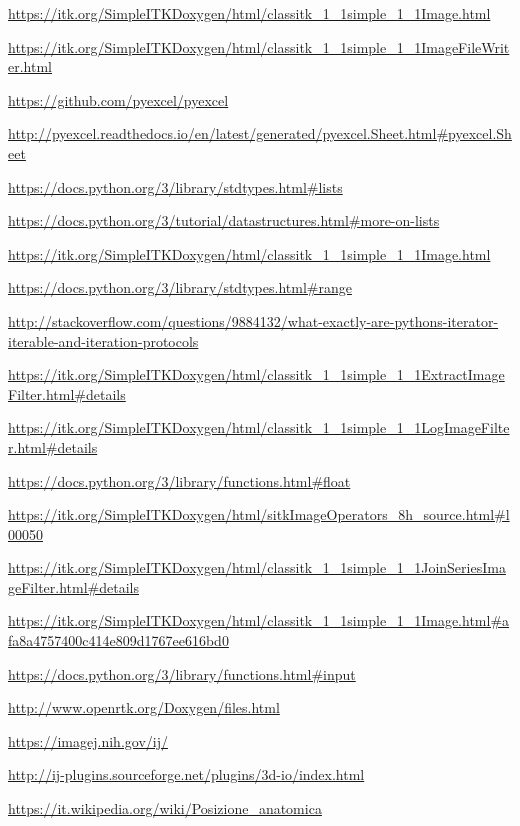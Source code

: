 \documentclass[a4paper,12pt, doubleside]{report}
\begin{document}
\begin{thebibliography}{1}
        \url{https://itk.org/SimpleITKDoxygen/html/classitk_1_1simple_1_1Image.html}
        
        \url{https://itk.org/SimpleITKDoxygen/html/classitk_1_1simple_1_1ImageFileWriter.html}
        
        \url{https://github.com/pyexcel/pyexcel}
        
        \url{http://pyexcel.readthedocs.io/en/latest/generated/pyexcel.Sheet.html#pyexcel.Sheet}
        
        \url{https://docs.python.org/3/library/stdtypes.html#lists} 
       
        \url{https://docs.python.org/3/tutorial/datastructures.html#more-on-lists}
        
        \url{https://itk.org/SimpleITKDoxygen/html/classitk_1_1simple_1_1Image.html}
    
        \url{https://docs.python.org/3/library/stdtypes.html#range}
        
        \url{http://stackoverflow.com/questions/9884132/what-exactly-are-pythons-iterator-iterable-and-iteration-protocols} 
        
        \url{https://itk.org/SimpleITKDoxygen/html/classitk_1_1simple_1_1ExtractImageFilter.html#details}
        
        \url{https://itk.org/SimpleITKDoxygen/html/classitk_1_1simple_1_1LogImageFilter.html#details}
        
        \url{https://docs.python.org/3/library/functions.html#float}
    
        \url{https://itk.org/SimpleITKDoxygen/html/sitkImageOperators_8h_source.html#l00050}
    
        \url{https://itk.org/SimpleITKDoxygen/html/classitk_1_1simple_1_1JoinSeriesImageFilter.html#details}
    
        \url{https://itk.org/SimpleITKDoxygen/html/classitk_1_1simple_1_1Image.html#afa8a4757400c414e809d1767ee616bd0}

        \url{https://docs.python.org/3/library/functions.html#input}
        
        \url{http://www.openrtk.org/Doxygen/files.html}
    
        \url{https://imagej.nih.gov/ij/}
        
        \url{http://ij-plugins.sourceforge.net/plugins/3d-io/index.html}
        
        \url{https://it.wikipedia.org/wiki/Posizione_anatomica}

    \end{thebibliography}
\end{document}
